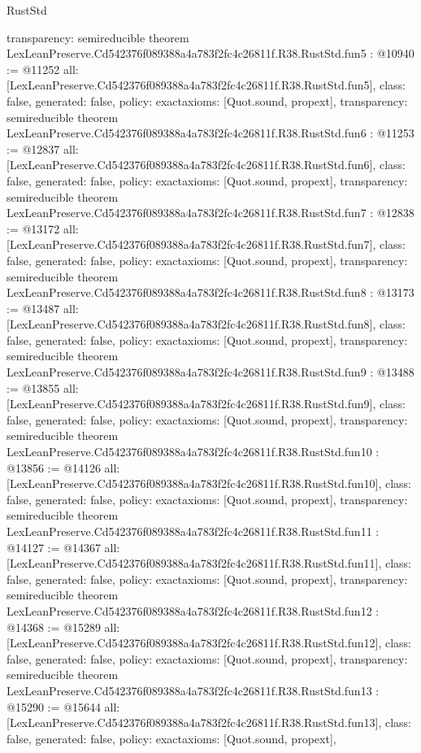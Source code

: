 \begin{lexlean}{RustStd}
\begin{coremodule}
{  transparency: semireducible
}
theorem LexLeanPreserve.Cd542376f089388a4a783f2fc4c26811f.R38.RustStd.fun5 : @10940 := @11252 {
  all: [LexLeanPreserve.Cd542376f089388a4a783f2fc4c26811f.R38.RustStd.fun5],
  class: false,
  generated: false,
  policy: exact{axioms: [Quot.sound, propext]},
  transparency: semireducible
}
theorem LexLeanPreserve.Cd542376f089388a4a783f2fc4c26811f.R38.RustStd.fun6 : @11253 := @12837 {
  all: [LexLeanPreserve.Cd542376f089388a4a783f2fc4c26811f.R38.RustStd.fun6],
  class: false,
  generated: false,
  policy: exact{axioms: [Quot.sound, propext]},
  transparency: semireducible
}
theorem LexLeanPreserve.Cd542376f089388a4a783f2fc4c26811f.R38.RustStd.fun7 : @12838 := @13172 {
  all: [LexLeanPreserve.Cd542376f089388a4a783f2fc4c26811f.R38.RustStd.fun7],
  class: false,
  generated: false,
  policy: exact{axioms: [Quot.sound, propext]},
  transparency: semireducible
}
theorem LexLeanPreserve.Cd542376f089388a4a783f2fc4c26811f.R38.RustStd.fun8 : @13173 := @13487 {
  all: [LexLeanPreserve.Cd542376f089388a4a783f2fc4c26811f.R38.RustStd.fun8],
  class: false,
  generated: false,
  policy: exact{axioms: [Quot.sound, propext]},
  transparency: semireducible
}
theorem LexLeanPreserve.Cd542376f089388a4a783f2fc4c26811f.R38.RustStd.fun9 : @13488 := @13855 {
  all: [LexLeanPreserve.Cd542376f089388a4a783f2fc4c26811f.R38.RustStd.fun9],
  class: false,
  generated: false,
  policy: exact{axioms: [Quot.sound, propext]},
  transparency: semireducible
}
theorem LexLeanPreserve.Cd542376f089388a4a783f2fc4c26811f.R38.RustStd.fun10 : @13856 := @14126 {
  all: [LexLeanPreserve.Cd542376f089388a4a783f2fc4c26811f.R38.RustStd.fun10],
  class: false,
  generated: false,
  policy: exact{axioms: [Quot.sound, propext]},
  transparency: semireducible
}
theorem LexLeanPreserve.Cd542376f089388a4a783f2fc4c26811f.R38.RustStd.fun11 : @14127 := @14367 {
  all: [LexLeanPreserve.Cd542376f089388a4a783f2fc4c26811f.R38.RustStd.fun11],
  class: false,
  generated: false,
  policy: exact{axioms: [Quot.sound, propext]},
  transparency: semireducible
}
theorem LexLeanPreserve.Cd542376f089388a4a783f2fc4c26811f.R38.RustStd.fun12 : @14368 := @15289 {
  all: [LexLeanPreserve.Cd542376f089388a4a783f2fc4c26811f.R38.RustStd.fun12],
  class: false,
  generated: false,
  policy: exact{axioms: [Quot.sound, propext]},
  transparency: semireducible
}
theorem LexLeanPreserve.Cd542376f089388a4a783f2fc4c26811f.R38.RustStd.fun13 : @15290 := @15644 {
  all: [LexLeanPreserve.Cd542376f089388a4a783f2fc4c26811f.R38.RustStd.fun13],
  class: false,
  generated: false,
  policy: exact{axioms: [Quot.sound, propext]},
}
\end{coremodule}
\end{lexlean}
